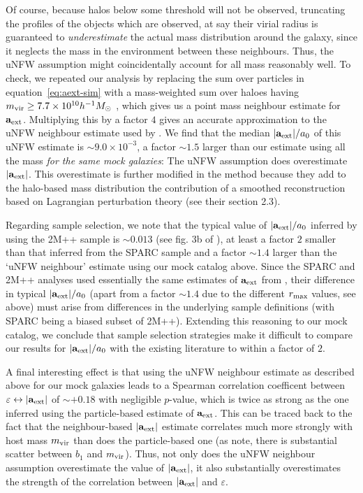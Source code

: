 \documentclass[usenatbib]{mnras}
\newcommand{\aext}{\ensuremath{\mathbf{a}_{\rm ext}}}
\newcommand{\Mh}{\ensuremath{h^{-1}M_{\odot}}}
\newcommand{\eqn}[1]{equation~\eqref{#1}}
\begin{document}
Of course, because halos below some threshold will not be observed, truncating the profiles of the objects which are observed, at say their virial radius is guaranteed to \emph{underestimate} the actual mass distribution around the galaxy, since it neglects the mass in the environment between these neighbours. Thus, the uNFW assumption might coincidentally account for all mass reasonably well. To check, we repeated our analysis by replacing the sum over particles in \eqn{eq:aext-sim} with a mass-weighted sum over haloes having $m_{\rm vir}\geq7.7\times10^{10}\Mh$ , which gives us a point mass neighbour estimate for \aext. Multiplying this by a factor $4$ gives an accurate approximation to the uNFW neighbour estimate used by . We find that the median $|\aext|/a_0$ of this uNFW estimate is $\sim9.0\times10^{-3}$, a factor $\sim1.5$ larger than our estimate using all the mass \emph{for the same mock galaxies}: The uNFW assumption does overestimate $|\aext|$. This overestimate is further modified in the  method because they add to the halo-based mass distribution the contribution of a smoothed reconstruction based on Lagrangian perturbation theory (see their section 2.3).

Regarding sample selection, we note that the typical value of $|\aext|/a_0$ inferred by  using the 2M++ sample \citep{lh11} is $\sim0.013$ (see fig. 3b of ), at least a factor $2$ smaller than that inferred from the SPARC sample and a factor $\sim1.4$ larger than the `uNFW neighbour' estimate using our mock catalog above. Since the SPARC and 2M++ analyses used essentially the same estimates of $\aext$ from , their difference in typical $|\aext|/a_0$ (apart from a factor $\sim1.4$ due to the different $r_{\rm max}$ values, see above) must arise from differences in the underlying sample definitions (with SPARC being a biased subset of 2M++). Extending this reasoning to our mock catalog, we conclude that sample selection strategies make it difficult to compare our results for $|\aext|/a_0$ with the existing literature to within a factor of $2$.

A final interesting effect is that using the uNFW neighbour estimate as described above for our mock galaxies leads to a Spearman correlation coefficent between $\varepsilon\leftrightarrow|\aext|$ of $\sim+0.18$ with negligible $p$-value, which is twice as strong as the one inferred using the particle-based estimate of \aext. This can be traced back to the fact that the neighbour-based $|\aext|$ estimate correlates much more strongly with host mass $m_{\rm vir}$ than does the particle-based one (as \citealp{phs18} note, there is substantial scatter between $b_1$ and $m_{\rm vir}$). Thus, not only does the uNFW neighbour assumption overestimate the value of $|\aext|$, it also substantially overestimates the strength of the correlation between $|\aext|$ and $\varepsilon$. 
\end{document}
